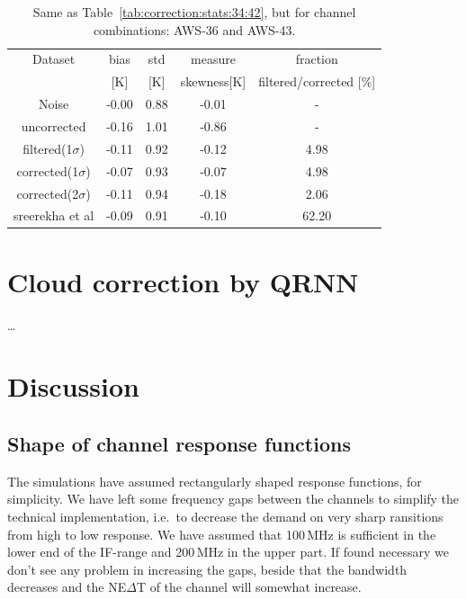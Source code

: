 \documentclass[12pt]{article}
\begin{document}
\begin{table}[!bt]
	\centering
	\begin{tabular}[b]{c|c|c|c|c}
		Dataset  		  &   bias &   std &   measure & fraction  \\
		&   [K]  &   [K] & skewness[K] &				filtered/corrected [\%]\\
		\hline
Noise             &  -0.00 &  0.88 &              -0.01 &                - \\
uncorrected       &  -0.16 &  1.01 &              -0.86 &                - \\
filtered(1$\sigma$)  &  -0.11 &  0.92 &              -0.12 &                4.98 \\
corrected(1$\sigma$) &  -0.07 &  0.93 &              -0.07 &                4.98 \\
corrected(2$\sigma$) &  -0.11 &  0.94 &              -0.18 &                2.06 \\
sreerekha et al   &  -0.09 &  0.91 &              -0.10 &               62.20 \\
		\hline
	\end{tabular}
	\caption{Same as Table~\ref{tab:correction:stats:34:42}, but for channel combinations: AWS-36 and AWS-43.   }
	\label{tab:correction:stats:36:43}
\end{table}


\section{Cloud correction by QRNN}
%
\dots


\section{Discussion}


\subsection{Shape of channel response functions}
%
The simulations have assumed rectangularly shaped response functions, for
simplicity. We have left some frequency gaps between the channels to simplify
the technical implementation, i.e.\ to decrease the demand on very sharp
ransitions from high to low response. We have assumed that 100\,MHz is
sufficient in the lower end of the IF-range and 200\,MHz in the upper part. If
found necessary we don't see any problem in increasing the gaps, beside that
the bandwidth decreases and the NE$\Delta$T of the channel will somewhat
increase.
\end{document}
